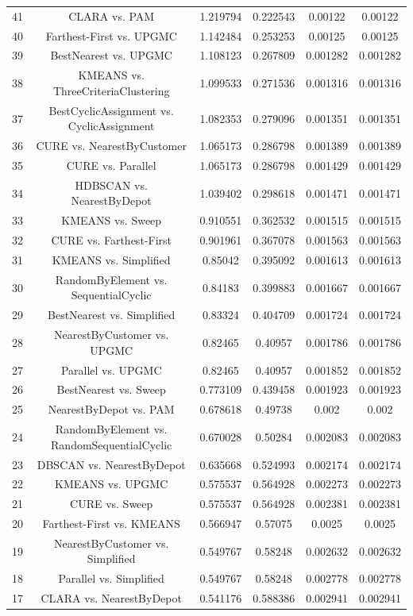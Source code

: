 \documentclass[a4paper,10pt]{article}
\begin{document}
\begin{landscape}
\begin{table}[!htp]
\begin{tabular}{cccccc}
41&CLARA vs. PAM&1.219794&0.222543&0.00122&0.00122\\
40&Farthest-First vs. UPGMC&1.142484&0.253253&0.00125&0.00125\\
39&BestNearest vs. UPGMC&1.108123&0.267809&0.001282&0.001282\\
38&KMEANS vs. ThreeCriteriaClustering&1.099533&0.271536&0.001316&0.001316\\
37&BestCyclicAssignment vs. CyclicAssignment&1.082353&0.279096&0.001351&0.001351\\
36&CURE vs. NearestByCustomer&1.065173&0.286798&0.001389&0.001389\\
35&CURE vs. Parallel&1.065173&0.286798&0.001429&0.001429\\
34&HDBSCAN vs. NearestByDepot&1.039402&0.298618&0.001471&0.001471\\
33&KMEANS vs. Sweep&0.910551&0.362532&0.001515&0.001515\\
32&CURE vs. Farthest-First&0.901961&0.367078&0.001563&0.001563\\
31&KMEANS vs. Simplified&0.85042&0.395092&0.001613&0.001613\\
30&RandomByElement vs. SequentialCyclic&0.84183&0.399883&0.001667&0.001667\\
29&BestNearest vs. Simplified&0.83324&0.404709&0.001724&0.001724\\
28&NearestByCustomer vs. UPGMC&0.82465&0.40957&0.001786&0.001786\\
27&Parallel vs. UPGMC&0.82465&0.40957&0.001852&0.001852\\
26&BestNearest vs. Sweep&0.773109&0.439458&0.001923&0.001923\\
25&NearestByDepot vs. PAM&0.678618&0.49738&0.002&0.002\\
24&RandomByElement vs. RandomSequentialCyclic&0.670028&0.50284&0.002083&0.002083\\
23&DBSCAN vs. NearestByDepot&0.635668&0.524993&0.002174&0.002174\\
22&KMEANS vs. UPGMC&0.575537&0.564928&0.002273&0.002273\\
21&CURE vs. Sweep&0.575537&0.564928&0.002381&0.002381\\
20&Farthest-First vs. KMEANS&0.566947&0.57075&0.0025&0.0025\\
19&NearestByCustomer vs. Simplified&0.549767&0.58248&0.002632&0.002632\\
18&Parallel vs. Simplified&0.549767&0.58248&0.002778&0.002778\\
17&CLARA vs. NearestByDepot&0.541176&0.588386&0.002941&0.002941\\

\end{tabular}
\end{table}
\end{landscape}
\end{document}
